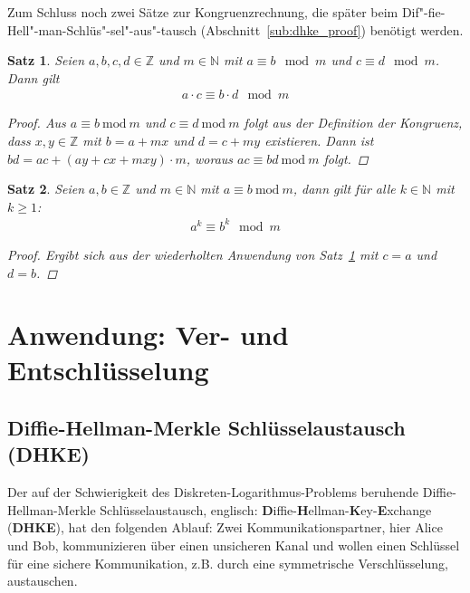 \documentclass[
  a4paper,
  11pt,
]{scrartcl}
\theoremstyle{plain}
\newtheorem{satz}{Satz}
\theoremstyle{definition}
\theoremstyle{remark}
\newcommand{\N}{\mathbb{N}}
\newcommand{\Z}{\mathbb{Z}}
\newcommand{\Mod}[1]{\ \mathrm{mod}\ #1}
\begin{document}
Zum Schluss noch zwei Sätze zur Kongruenzrechnung, die später beim
Dif"-fie-Hell"-man-Schlüs"-sel"-aus"-tausch (Abschnitt~\ref{sub:dhke_proof})
benötigt werden.

\begin{satz}\label{satz:multiplikation_modulo}
  Seien $a,b,c,d \in \Z$ und $m \in \N$ mit $a \equiv b \mod m$ und $c \equiv d
  \mod m$. Dann gilt
  \begin{align*}
    a \cdot c \equiv b \cdot d \mod m
  \end{align*}
  \begin{proof}
    Aus $a \equiv b \Mod{m}$ und $c \equiv d \Mod{m}$ folgt aus der Definition
    der Kongruenz, dass $x, y \in \Z$ mit $b = a+mx$ und $d = c+my$ existieren.
    Dann ist $bd = ac + (ay + cx + mxy) \cdot m$, woraus $ac \equiv bd \Mod{m}$
    folgt.
  \end{proof}
\end{satz}

\begin{satz}\label{satz:potenzen_bei_kongruenzen}
  Seien $a, b \in \Z$ und $m \in \N$ mit $a \equiv b \Mod{m}$, dann gilt für
  alle $k \in \N$ mit $k \geq 1$:
  \begin{align*}
    a^k \equiv b^k \mod m
  \end{align*}
  \begin{proof}
    Ergibt sich aus der wiederholten Anwendung von
    Satz~\ref{satz:multiplikation_modulo} mit $c = a$ und $d = b$.
  \end{proof}
\end{satz}

\section{Anwendung: Ver- und Entschlüsselung}
\label{sec:anwendung_ver_und_entschlusselung}

\subsection{Diffie-Hellman-Merkle Schlüsselaustausch (DHKE)}
\label{sub:diffie_hellman_key_exchange}

Der auf der Schwierigkeit des Diskreten-Logarithmus-Problems beruhende Diffie-Hellman-Merkle Schlüsselaustausch, englisch: \textbf{D}iffie-\textbf{H}ellman-\textbf{K}ey-\textbf{E}xchange (\textbf{DHKE}), hat den folgenden Ablauf:
Zwei Kommunikationspartner, hier Alice und Bob, kommunizieren über einen unsicheren Kanal und wollen einen Schlüssel für eine sichere Kommunikation, z.B. durch eine symmetrische Verschlüsselung, austauschen.
\end{document}
